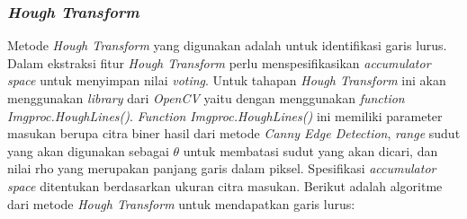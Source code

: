 \subsubsection{\textit{Hough Transform}}
\noindent Metode \textit{Hough Transform} yang digunakan adalah untuk identifikasi garis lurus. Dalam ekstraksi fitur \textit{Hough Transform} perlu menspesifikasikan \textit{accumulator space} untuk menyimpan nilai \textit{voting}. Untuk tahapan \textit{Hough Transform} ini akan menggunakan \textit{library} dari \textit{OpenCV} yaitu dengan menggunakan \textit{function} \textit{Imgproc.HoughLines()}. \textit{Function} \textit{Imgproc.HoughLines()} ini memiliki parameter masukan berupa citra biner hasil dari metode \textit{Canny Edge Detection}, \textit{range} sudut yang akan digunakan sebagai $\theta$ untuk membatasi sudut yang akan dicari, dan  nilai rho yang merupakan panjang garis dalam piksel. Spesifikasi \textit{accumulator space} ditentukan berdasarkan ukuran citra masukan. Berikut adalah algoritme dari metode \textit{Hough Transform} untuk mendapatkan garis lurus:
